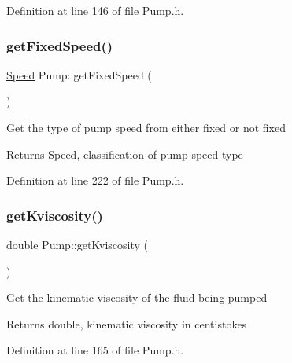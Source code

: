 Definition at line 146 of file Pump.\+h.

\mbox{\label{class_pump_ae9a63b7e616ba2ef7723d1040af241b4}} 
\subsubsection{\texorpdfstring{get\+Fixed\+Speed()}{getFixedSpeed()}}
{\footnotesize\ttfamily \hyperlink{class_pump_ae443603074ebca82f0b89209482d10b6}{Speed} Pump\+::get\+Fixed\+Speed (\begin{DoxyParamCaption}{ }\end{DoxyParamCaption})\hspace{0.3cm}{\ttfamily [inline]}}

Get the type of pump speed from either fixed or not fixed

\begin{DoxyReturn}{Returns}
Speed, classification of pump speed type 
\end{DoxyReturn}


Definition at line 222 of file Pump.\+h.

\mbox{\label{class_pump_a7b834ffb06cbfd643043e3a26ca1af6e}} 
\subsubsection{\texorpdfstring{get\+Kviscosity()}{getKviscosity()}}
{\footnotesize\ttfamily double Pump\+::get\+Kviscosity (\begin{DoxyParamCaption}{ }\end{DoxyParamCaption})\hspace{0.3cm}{\ttfamily [inline]}}

Get the kinematic viscosity of the fluid being pumped

\begin{DoxyReturn}{Returns}
double, kinematic viscosity in centistokes 
\end{DoxyReturn}


Definition at line 165 of file Pump.\+h.

\mbox{\label{class_pump_a66870deae37979d64a910b89c6977b26}} 
